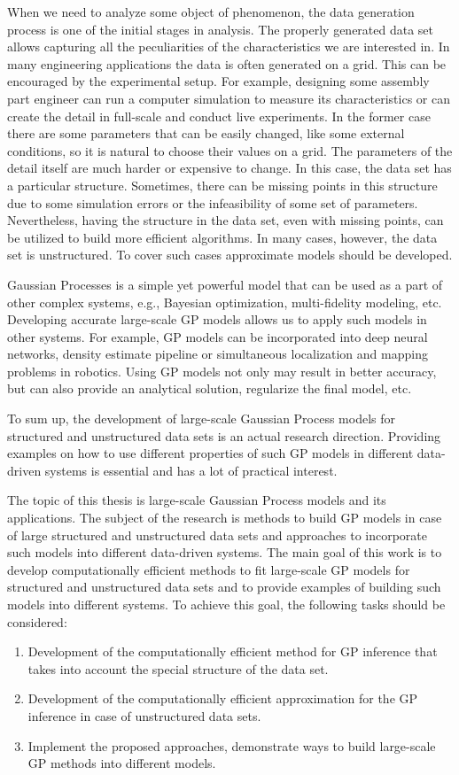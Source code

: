 When we need to analyze some object of phenomenon, the data generation process is one of the
initial stages in analysis.
The properly generated data set allows capturing all the peculiarities of
the characteristics we are interested in.
In many engineering applications the data is often generated on a grid.
This can be encouraged by the experimental setup.
For example, designing some assembly part engineer can run a computer simulation
to measure its characteristics or can create the detail in full-scale
and conduct live experiments.
In the former case there are some parameters that can be easily changed,
like some external conditions, so it is natural to choose their values on a grid.
The parameters of the detail itself are much harder or expensive to change.
In this case, the data set has a particular structure.
Sometimes, there can be missing points in this structure due
to some simulation errors or the infeasibility of some set of parameters.
Nevertheless, having the structure in the data set, even with missing points,
can be utilized to build more efficient algorithms.
In many cases, however, the data set is unstructured.
To cover such cases approximate models should be developed.

Gaussian Processes is a simple yet powerful model that can be used
as a part of other complex systems, e.g., Bayesian optimization,
multi-fidelity modeling, etc.
Developing accurate large-scale GP models allows us to
apply such models in other systems.
For example, GP models can be incorporated into deep neural networks,
density estimate pipeline or simultaneous localization and mapping
problems in robotics.
Using GP models not only may result in better accuracy,
but can also provide an analytical solution, regularize the final model, etc.

To sum up, the development of large-scale Gaussian Process models for
structured and unstructured data sets is an actual research direction.
Providing examples on how to use different properties of such GP models
in different data-driven systems is essential and has a lot of practical
interest.

The topic of this thesis is large-scale Gaussian Process models
and its applications.
The subject of the research is
methods to build GP models in case of large structured and unstructured data sets
and approaches to incorporate such models into different data-driven systems.
The main goal of this work is to develop computationally efficient
methods to fit large-scale GP models for structured and unstructured data sets
and to provide examples of building such models into different systems.
To achieve this goal, the following tasks should be considered:
\begin{enumerate}
    \item Development of the computationally efficient method for GP inference
    that takes into account the special structure of the data set.
    \item Development of the computationally efficient approximation for the GP inference
    in case of unstructured data sets.
    \item Implement the proposed approaches, demonstrate ways to build large-scale GP methods into different models.
\end{enumerate}

